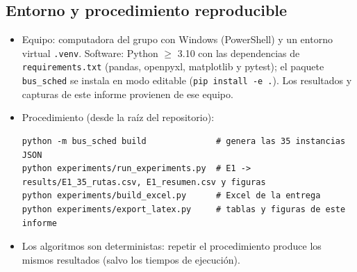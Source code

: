 \subsection{Entorno y procedimiento reproducible}
\begin{itemize}
  \item Equipo: computadora del grupo con Windows (PowerShell) y un entorno virtual \texttt{.venv}. Software: Python $\ge$ 3.10 con las dependencias de \texttt{requirements.txt} (pandas, openpyxl, matplotlib y pytest); el paquete \texttt{bus\_sched} se instala en modo editable (\texttt{pip install -e .}). Los resultados y capturas de este informe provienen de ese equipo.
  \item Procedimiento (desde la raíz del repositorio):
\begin{lstlisting}
python -m bus_sched build              # genera las 35 instancias JSON
python experiments/run_experiments.py  # E1 -> results/E1_35_rutas.csv, E1_resumen.csv y figuras
python experiments/build_excel.py      # Excel de la entrega
python experiments/export_latex.py     # tablas y figuras de este informe
\end{lstlisting}
  \item Los algoritmos son deterministas: repetir el procedimiento produce los mismos resultados (salvo los tiempos de ejecución).
\end{itemize}
